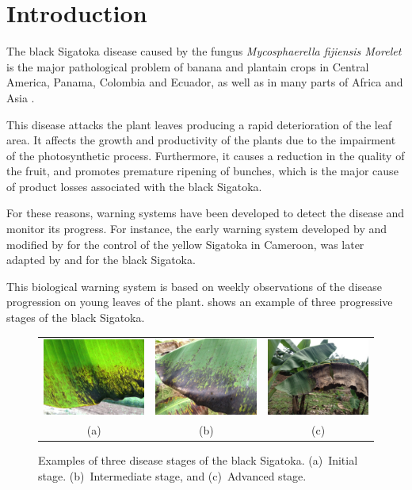 \section{Introduction}

The black Sigatoka disease caused by the fungus \emph{Mycosphaerella
  fijiensis Morelet} is the major pathological problem of banana and
plantain crops in Central America, Panama, Colombia and Ecuador, as well as in
many parts of Africa and Asia \citep{MarinVargas1995}.

This disease attacks the plant leaves producing a rapid deterioration
of the leaf area. It affects the growth and productivity of the plants
due to the impairment of the photosynthetic process.  Furthermore, it
causes a reduction in the quality of the fruit, and promotes premature
ripening of bunches, which is the major cause of product losses
associated with the black Sigatoka.

For these reasons, warning systems have been developed to detect the
disease and monitor its progress.  For instance, the early warning
system developed by \citet{ganry1983} and modified by
\citet{ganry1972} for the control of the yellow Sigatoka in Cameroon,
was later adapted by \citet{Ternesien1985} and \citet{foure1988} for
the black Sigatoka.

This biological warning system is based on weekly observations of the
disease progression on young leaves of the plant.
%
 shows an example of three progressive
stages of the black Sigatoka.
%	 
\begin{figure}[ht] 
\centering
\begin{tabular}{c@{\;}c@{\;}c}
  \includegraphics[width=.32\linewidth]{Roya_a} &
  \includegraphics[width=.32\linewidth]{Roya_b} &
  \includegraphics[width=.32\linewidth]{Roya_c} \\
  (a) & (b) & (c) 
\end{tabular}
\caption{Examples of three disease stages of the black Sigatoka. 
(a)~Initial stage. (b)~Intermediate stage, and (c)~Advanced stage.} 
\label{fig:diseasestages} 
\end{figure}

